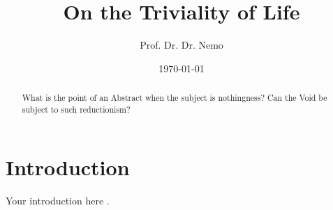 \documentclass{article}
\title{On the Triviality of Life}
\author{Prof. Dr. Dr. Nemo}
\date{\today}
\begin{document}
\maketitle

\begin{abstract}
What is the point of an Abstract when the subject is nothingness? Can the Void be subject to such reductionism?
\end{abstract}

\section{Introduction}
Your introduction here \cite{example}.



\end{document}
